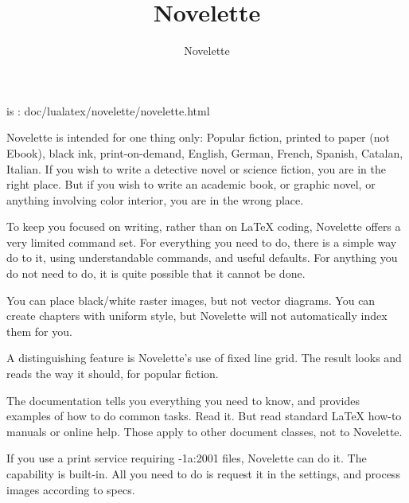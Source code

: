 \documentclass{novelette} %
\title{Novelette}
\author{Novelette}
\begin{document}
\mainmatter
\begin{upperpage}
\null\null
{}
\null
{}
\null\null
\end{upperpage}
 is :
doc/lualatex/novelette/novelette.html

Novelette is intended for one thing only: Popular fiction, printed to paper
(not Ebook), black ink, print-on-demand, English, German, French, Spanish,
Catalan, Italian.
If you wish to write a detective novel or science fiction, you are in the
right place. But if you wish to write an academic book, or graphic novel,
or anything involving color interior, you are in the wrong place.

To keep you focused on writing, rather than on LaTeX coding, Novelette offers
a very limited command set. For everything you need to do, there is a simple
way do to it, using understandable commands, and useful defaults. For anything
you do not need to do, it is quite possible that it cannot be done.

You can place black/white raster images, but not vector diagrams. You can
create chapters with uniform style, but Novelette will not automatically
index them for you.

A distinguishing feature is Novelette's use of fixed line grid. The result
looks and reads the way it should, for popular fiction.

The  documentation tells you everything you need to know,
and provides examples of how to do common tasks. Read it. But 
read standard LaTeX how-to manuals or online help. Those apply to other
document classes, not to Novelette.

If you use a print service requiring -1a:2001 files, Novelette
can do it. The capability is built-in. All you need to do is request it in the
settings, and process images according to specs.
\end{document}
